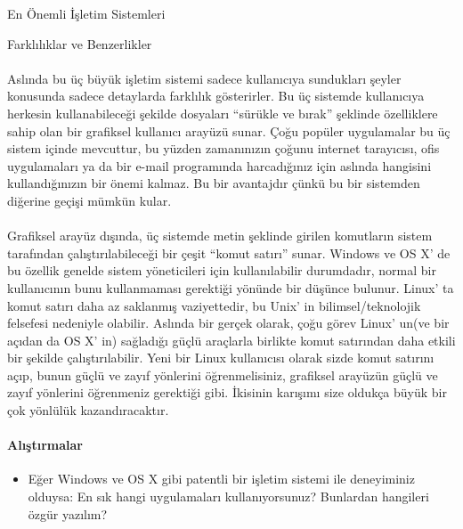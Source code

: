 \documentclass[10pt,a5paper]{book}
\begin{document}
\begin{section}{En Önemli İşletim Sistemleri}
\begin{subsection}{Farklılıklar ve Benzerlikler}
\paragraph{}{Aslında bu üç büyük işletim sistemi sadece kullanıcıya sundukları şeyler konusunda sadece detaylarda farklılık gösterirler. Bu üç sistemde kullanıcıya herkesin kullanabileceği şekilde dosyaları “sürükle ve bırak” şeklinde özelliklere sahip olan bir grafiksel kullanıcı arayüzü sunar. Çoğu popüler uygulamalar bu üç sistem içinde mevcuttur, bu yüzden zamanınızın çoğunu internet tarayıcısı, ofis uygulamaları ya da bir e-mail programında harcadığınız için aslında hangisini kullandığınızın bir önemi kalmaz. Bu bir avantajdır çünkü bu bir sistemden diğerine geçişi mümkün kular.}
\paragraph{}{Grafiksel arayüz dışında, üç sistemde metin şeklinde girilen komutların sistem tarafından çalıştırılabileceği bir çeşit “komut satırı” sunar. Windows ve OS X' de bu özellik genelde sistem yöneticileri için kullanılabilir durumdadır, normal bir kullanıcının bunu kullanmaması gerektiği yönünde bir düşünce bulunur. Linux' ta komut satırı daha az saklanmış vaziyettedir, bu Unix' in bilimsel/teknolojik felsefesi nedeniyle olabilir. Aslında bir gerçek olarak, çoğu görev Linux' un(ve bir açıdan da OS X' in) sağladığı güçlü araçlarla birlikte komut satırından daha etkili bir şekilde çalıştırılabilir. Yeni bir Linux kullanıcısı olarak sizde komut satırını açıp, bunun güçlü ve zayıf yönlerini öğrenmelisiniz, grafiksel arayüzün güçlü ve zayıf yönlerini öğrenmeniz gerektiği gibi. İkisinin karışımı size oldukça büyük bir çok yönlülük kazandıracaktır.}
\paragraph{Alıştırmalar}{}
\begin{itemize}
 \item Eğer Windows ve OS X gibi patentli bir işletim sistemi ile deneyiminiz olduysa: En sık hangi uygulamaları kullanıyorsunuz? Bunlardan hangileri özgür yazılım?
\end{itemize}
\end{subsection}
\end{section}
\end{document}
